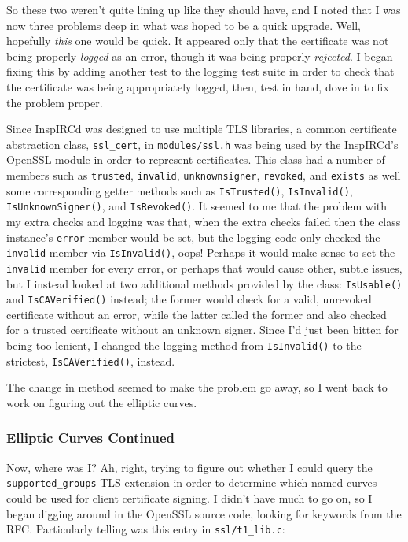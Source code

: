 \documentclass{article}
\begin{document}
So these two weren't quite lining up like they should have, and I noted that I was now three problems deep in what was hoped to be a quick upgrade.  Well, hopefully \emph{this} one would be quick.  It appeared only that the certificate was not being properly \emph{logged} as an error, though it was being properly \emph{rejected}.  I began fixing this by adding another test to the logging test suite in order to check that the certificate was being appropriately logged, then, test in hand, dove in to fix the problem proper.

Since InspIRCd was designed to use multiple TLS libraries, a common certificate abstraction class, \texttt{ssl_cert}, in \texttt{modules/ssl.h} was being used by the InspIRCd's OpenSSL module in order to represent certificates.  This class had a number of members such as \texttt{trusted}, \texttt{invalid}, \texttt{unknownsigner}, \texttt{revoked}, and \texttt{exists} as well some corresponding getter methods such as \texttt{IsTrusted()}, \texttt{IsInvalid()}, \texttt{IsUnknownSigner()}, and \texttt{IsRevoked()}.  It seemed to me that the problem with my extra checks and logging was that, when the extra checks failed then the class instance's \texttt{error} member would be set, but the logging code only checked the \texttt{invalid} member via \texttt{IsInvalid()}, oops!  Perhaps it would make sense to set the \texttt{invalid} member for every error, or perhaps that would cause other, subtle issues, but I instead looked at two additional methods provided by the class: \texttt{IsUsable()} and \texttt{IsCAVerified()} instead; the former would check for a valid, unrevoked certificate without an error, while the latter called the former and also checked for a trusted certificate without an unknown signer.  Since I'd just been bitten for being too lenient, I changed the logging method from \texttt{IsInvalid()} to the strictest, \texttt{IsCAVerified()}, instead.

The change in method seemed to make the problem go away, so I went back to work on figuring out the elliptic curves.

\subsubsection{Elliptic Curves Continued}
Now, where was I?  Ah, right, trying to figure out whether I could query the \texttt{supported_groups} TLS extension in order to determine which named curves could be used for client certificate signing.  I didn't have much to go on, so I began digging around in the OpenSSL source code, looking for keywords from the RFC.  Particularly telling was this entry in \texttt{ssl/t1_lib.c}:
\end{document}
